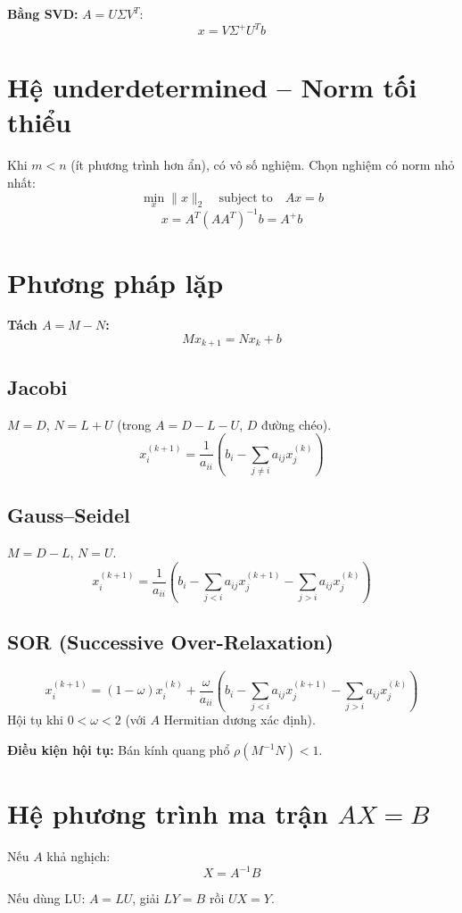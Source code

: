\textbf{Bằng SVD:} $A = U\Sigma V^T$:
\[
x = V\Sigma^+ U^T b
\]

\section{Hệ underdetermined -- Norm tối thiểu}

Khi $m < n$ (ít phương trình hơn ẩn), có vô số nghiệm. Chọn nghiệm có norm nhỏ nhất:
\[
\min_x \|x\|_2 \quad \text{subject to} \quad Ax = b
\]
\[
x = A^T(AA^T)^{-1}b = A^+ b
\]

\section{Phương pháp lặp}

\textbf{Tách $A = M - N$:}
\[
Mx_{k+1} = Nx_k + b
\]

\subsection{Jacobi}
$M = D$, $N = L + U$ (trong $A = D - L - U$, $D$ đường chéo).
\[
x^{(k+1)}_i = \frac{1}{a_{ii}} \left( b_i - \sum_{j \neq i} a_{ij} x^{(k)}_j \right)
\]

\subsection{Gauss--Seidel}
$M = D - L$, $N = U$.
\[
x^{(k+1)}_i = \frac{1}{a_{ii}} \left( b_i - \sum_{j < i} a_{ij} x^{(k+1)}_j - \sum_{j > i} a_{ij} x^{(k)}_j \right)
\]

\subsection{SOR (Successive Over-Relaxation)}
\[
x^{(k+1)}_i = (1-\omega) x^{(k)}_i + \frac{\omega}{a_{ii}} \left( b_i - \sum_{j < i} a_{ij} x^{(k+1)}_j - \sum_{j > i} a_{ij} x^{(k)}_j \right)
\]
Hội tụ khi $0 < \omega < 2$ (với $A$ Hermitian dương xác định).

\textbf{Điều kiện hội tụ:} Bán kính quang phổ $\rho(M^{-1}N) < 1$.

\section{Hệ phương trình ma trận $AX = B$}

Nếu $A$ khả nghịch:
\[
X = A^{-1}B
\]

Nếu dùng LU: $A = LU$, giải $LY = B$ rồi $UX = Y$.

